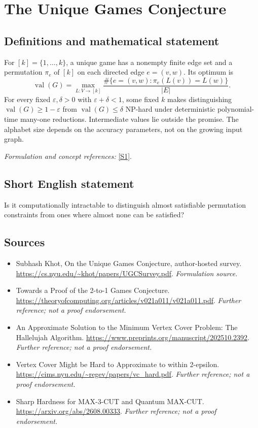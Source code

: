 \documentclass[11pt]{article}
\begin{document}
\section*{\texorpdfstring{The Unique Games Conjecture}{The Unique Games Conjecture}}\label{statement}
\subsection{Definitions and mathematical statement}
For $[k]=\{1,\ldots,k\}$, a unique game has a nonempty finite edge set and a permutation $\pi_e$ of $[k]$ on each directed edge $e=(v,w)$. Its optimum is
\[
 \operatorname{val}(G)=\max_{L:V\to[k]}\frac{\#\{e=(v,w):\pi_e(L(v))=L(w)\}}{|E|}.
\]
For every fixed $\varepsilon,\delta>0$ with $\varepsilon+\delta<1$, some fixed $k$ makes distinguishing $\operatorname{val}(G)\ge1-\varepsilon$ from $\operatorname{val}(G)\le\delta$ NP-hard under deterministic polynomial-time many-one reductions. Intermediate values lie outside the promise. The alphabet size depends on the accuracy parameters, not on the growing input graph.
\par\smallskip\textit{Formulation and concept references:} \href{https://cs.nyu.edu/~khot/papers/UGCSurvey.pdf}{[S1]}.

\subsection{Short English statement}
Is it computationally intractable to distinguish almost satisfiable permutation constraints from ones where almost none can be satisfied?
\subsection{Sources}
\begin{itemize}
\item[S1]Subhash Khot, On the Unique Games Conjecture, author-hosted survey.
\url{https://cs.nyu.edu/~khot/papers/UGCSurvey.pdf}.
\textit{Formulation source.}
\item[S2]Towards a Proof of the 2-to-1 Games Conjecture.
\url{https://theoryofcomputing.org/articles/v021a011/v021a011.pdf}.
\textit{Further reference; not a proof endorsement.}
\item[S3]An Approximate Solution to the Minimum Vertex Cover Problem: The Hallelujah Algorithm.
\url{https://www.preprints.org/manuscript/202510.2392}.
\textit{Further reference; not a proof endorsement.}
\item[S4]Vertex Cover Might be Hard to Approximate to within 2-epsilon.
\url{https://cims.nyu.edu/~regev/papers/vc_hard.pdf}.
\textit{Further reference; not a proof endorsement.}
\item[S5]Sharp Hardness for MAX-3-CUT and Quantum MAX-CUT.
\url{https://arxiv.org/abs/2608.00333}.
\textit{Further reference; not a proof endorsement.}
\end{itemize}
\end{document}
